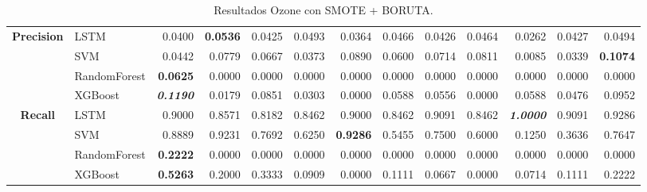 \begin{table}[H]
\begin{adjustbox}{max width=14cm}
\begin{tabular}{|c|l|r|r|r|r|r|r|r|r|r|r|r|}
			\hline
			\textbf{Precision} &  LSTM &  0.0400 & \textbf{  0.0536 } &  0.0425 &  0.0493 &  0.0364 &  0.0466 &  0.0426 &  0.0464 &  0.0262 &  0.0427 &  0.0494 \\
			&  SVM &  0.0442 &  0.0779 &  0.0667 &  0.0373 &  0.0890 &  0.0600 &  0.0714 &  0.0811 &  0.0085 &  0.0339 & \textbf{  0.1074 } \\
			&  RandomForest & \textbf{  0.0625 } &  0.0000 &  0.0000 &  0.0000 &  0.0000 &  0.0000 &  0.0000 &  0.0000 &  0.0000 &  0.0000 &  0.0000 \\
			&  XGBoost & \textit{ \textbf{  0.1190 } } &  0.0179 &  0.0851 &  0.0303 &  0.0000 &  0.0588 &  0.0556 &  0.0000 &  0.0588 &  0.0476 &  0.0952 \\
			\hline
			\textbf{Recall} &  LSTM &  0.9000 &  0.8571 &  0.8182 &  0.8462 &  0.9000 &  0.8462 &  0.9091 &  0.8462 & \textit{ \textbf{  1.0000 } } &  0.9091 &  0.9286 \\
			&  SVM &  0.8889 &  0.9231 &  0.7692 &  0.6250 & \textbf{  0.9286 } &  0.5455 &  0.7500 &  0.6000 &  0.1250 &  0.3636 &  0.7647 \\
			&  RandomForest & \textbf{  0.2222 } &  0.0000 &  0.0000 &  0.0000 &  0.0000 &  0.0000 &  0.0000 &  0.0000 &  0.0000 &  0.0000 &  0.0000 \\
			&  XGBoost & \textbf{  0.5263 } &  0.2000 &  0.3333 &  0.0909 &  0.0000 &  0.1111 &  0.0667 &  0.0000 &  0.0714 &  0.1111 &  0.2222 \\
			\hline
		\end{tabular}
	\end{adjustbox}
	\caption{Resultados Ozone con SMOTE + BORUTA.}
	\label{tab:Ozone_SMOTE_BORUTA}
\end{table}

